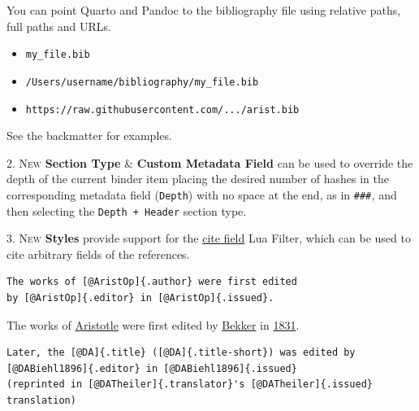 \documentclass[
  12pt,
  a4paper,
  oneside]{scrbook}
\providecommand{\tightlist}{%
  \setlength{\itemsep}{0pt}\setlength{\parskip}{0pt}}\usepackage{longtable,booktabs,array}
\begin{document}
\begin{tcolorbox}[enhanced jigsaw, toprule=.15mm, rightrule=.15mm, colbacktitle=quarto-callout-important-color!10!white, title=\textcolor{quarto-callout-important-color}{\faExclamation}\hspace{0.5em}{Important}, breakable, colback=white, leftrule=.75mm, titlerule=0mm, colframe=quarto-callout-important-color-frame, bottomtitle=1mm, opacityback=0, coltitle=black, toptitle=1mm, arc=.35mm, left=2mm, bottomrule=.15mm, opacitybacktitle=0.6]

You can point Quarto and Pandoc to the bibliography file using relative
paths, full paths and URLs.

\begin{itemize}
\tightlist
\item
  \texttt{my\_file.bib}
\item
  \texttt{/Users/username/bibliography/my\_file.bib}
\item
  \texttt{https://raw.githubusercontent.com/.../arist.bib}
\end{itemize}

\end{tcolorbox}

See the backmatter for examples.

\textsc{2. New} \textbf{Section Type} \& \textbf{Custom Metadata Field}
can be used to override the depth of the current binder item placing the
desired number of hashes in the corresponding metadata field
(\texttt{Depth}) with no space at the end, as in \texttt{\#\#\#}\emph{,}
and then selecting the \texttt{Depth\ +\ Header} section type.

\textsc{3. New} \textbf{Styles} provide support for the
\href{https://github.com/bcdavasconcelos/citefield}{cite field} Lua
Filter, which can be used to cite arbitrary fields of the references.

\begin{verbatim}
The works of [@AristOp]{.author} were first edited 
by [@AristOp]{.editor} in [@AristOp]{.issued}.  
\end{verbatim}

The works of
\protect\hypertarget{cite_37}{}{\label{cite_37}\protect\hyperlink{ref-AristOp}{Aristotle}}
were first edited by
\protect\hypertarget{cite_38}{}{\label{cite_38}\protect\hyperlink{ref-AristOp}{Bekker}}
in
\protect\hypertarget{cite_39}{}{\label{cite_39}\protect\hyperlink{ref-AristOp}{1831}}.

\begin{verbatim}
Later, the [@DA]{.title} ([@DA]{.title-short}) was edited by 
[@DABiehl1896]{.editor} in [@DABiehl1896]{.issued} 
(reprinted in [@DATheiler]{.translator}'s [@DATheiler]{.issued} translation)
\end{verbatim}
\end{document}
